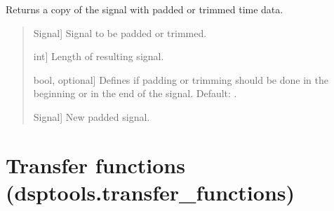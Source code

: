 \documentclass[letterpaper,10pt,english]{sphinxmanual}
\begin{document}
\begin{fulllineitems}
\label{\detokenize{modules/dsptools.standard_functions:dsptools.standard_functions.pad_trim}}
\pysigstartsignatures
{}
\pysigstopsignatures
\sphinxAtStartPar
Returns a copy of the signal with padded or trimmed time data.
\begin{quote}\begin{description}
\begin{description}
\sphinxlineitem{\sphinxstylestrong{signal}}{[}Signal{]}
\sphinxAtStartPar
Signal to be padded or trimmed.

\sphinxlineitem{\sphinxstylestrong{desired\_length\_samples}}{[}int{]}
\sphinxAtStartPar
Length of resulting signal.

\sphinxlineitem{\sphinxstylestrong{in\_the\_end}}{[}bool, optional{]}
\sphinxAtStartPar
Defines if padding or trimming should be done in the beginning or
in the end of the signal. Default: .

\end{description}

\begin{description}
\sphinxlineitem{\sphinxstylestrong{new\_signal}}{[}Signal{]}
\sphinxAtStartPar
New padded signal.

\end{description}

\end{description}\end{quote}

\end{fulllineitems}


\sphinxstepscope


\section{Transfer functions (dsptools.transfer\_functions)}
\label{\detokenize{modules/dsptools.transfer_functions:module-dsptools.transfer_functions}}\label{\detokenize{modules/dsptools.transfer_functions:transfer-functions-dsptools-transfer-functions}}\label{\detokenize{modules/dsptools.transfer_functions::doc}}
\end{document}
